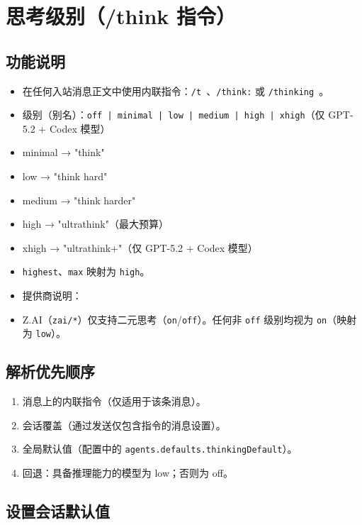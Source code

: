 \clearpage

\section{思考级别（/think 指令）}


\subsection{功能说明}


\begin{itemize}
  \item 在任何入站消息正文中使用内联指令：\texttt{/t }、\texttt{/think:} 或 \texttt{/thinking }。
  \item 级别（别名）：\texttt{off | minimal | low | medium | high | xhigh}（仅 GPT-5.2 + Codex 模型）
  \item minimal → "think"
  \item low → "think hard"
  \item medium → "think harder"
  \item high → "ultrathink"（最大预算）
  \item xhigh → "ultrathink+"（仅 GPT-5.2 + Codex 模型）
  \item \texttt{highest}、\texttt{max} 映射为 \texttt{high}。
  \item 提供商说明：
  \item Z.AI（\texttt{zai/*}）仅支持二元思考（\texttt{on}/\texttt{off}）。任何非 \texttt{off} 级别均视为 \texttt{on}（映射为 \texttt{low}）。
\end{itemize}


\subsection{解析优先顺序}


\begin{enumerate}
  \item 消息上的内联指令（仅适用于该条消息）。
  \item 会话覆盖（通过发送仅包含指令的消息设置）。
  \item 全局默认值（配置中的 \texttt{agents.defaults.thinkingDefault}）。
  \item 回退：具备推理能力的模型为 low；否则为 off。
\end{enumerate}


\subsection{设置会话默认值}


